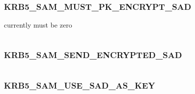 \documentclass[letterpaper,10pt,english]{sphinxmanual}
\begin{document}
\subsubsection{KRB5\_SAM\_MUST\_PK\_ENCRYPT\_SAD}
\label{appdev/refs/macros/KRB5_SAM_MUST_PK_ENCRYPT_SAD:krb5-sam-must-pk-encrypt-sad}\label{appdev/refs/macros/KRB5_SAM_MUST_PK_ENCRYPT_SAD:krb5-sam-must-pk-encrypt-sad-data}\label{appdev/refs/macros/KRB5_SAM_MUST_PK_ENCRYPT_SAD::doc}

\begin{fulllineitems}
\label{appdev/refs/macros/KRB5_SAM_MUST_PK_ENCRYPT_SAD:KRB5_SAM_MUST_PK_ENCRYPT_SAD}
\end{fulllineitems}


currently must be zero

\begin{tabulary}{\linewidth}{|L|L|}
\hline

 & 
\\\hline
\end{tabulary}



\subsubsection{KRB5\_SAM\_SEND\_ENCRYPTED\_SAD}
\label{appdev/refs/macros/KRB5_SAM_SEND_ENCRYPTED_SAD:krb5-sam-send-encrypted-sad}\label{appdev/refs/macros/KRB5_SAM_SEND_ENCRYPTED_SAD::doc}\label{appdev/refs/macros/KRB5_SAM_SEND_ENCRYPTED_SAD:krb5-sam-send-encrypted-sad-data}

\begin{fulllineitems}
\label{appdev/refs/macros/KRB5_SAM_SEND_ENCRYPTED_SAD:KRB5_SAM_SEND_ENCRYPTED_SAD}
\end{fulllineitems}


\begin{tabulary}{\linewidth}{|L|L|}
\hline

 & 
\\\hline
\end{tabulary}



\subsubsection{KRB5\_SAM\_USE\_SAD\_AS\_KEY}
\label{appdev/refs/macros/KRB5_SAM_USE_SAD_AS_KEY::doc}\label{appdev/refs/macros/KRB5_SAM_USE_SAD_AS_KEY:krb5-sam-use-sad-as-key}\label{appdev/refs/macros/KRB5_SAM_USE_SAD_AS_KEY:krb5-sam-use-sad-as-key-data}
\end{document}

